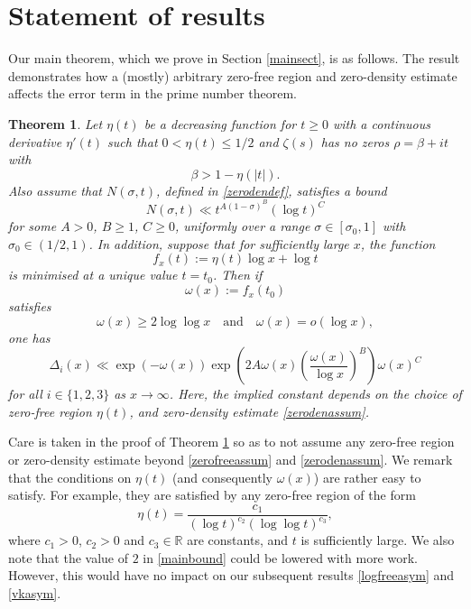 \documentclass[reqno]{amsart}
\newtheorem{theorem}{Theorem}[section]
\numberwithin{equation}{section}
\theoremstyle{remark}
\begin{document}
\section{Statement of results}
Our main theorem, which we prove in Section \ref{mainsect}, is as follows. The result demonstrates how a (mostly) arbitrary zero-free region and zero-density estimate affects the error term in the prime number theorem.
\begin{theorem}\label{mainthm}
    Let $\eta(t)$ be a decreasing function for $t\geq 0$ with a continuous derivative $\eta'(t)$ such that $0<\eta(t)\leq 1/2$ and $\zeta(s)$ has no zeros $\rho=\beta+it$ with
    \begin{equation}\label{zerofreeassum}
        \beta>1-\eta(|t|).
    \end{equation}
    Also assume that $N(\sigma,t)$, defined in \eqref{zerodendef}, satisfies a bound
    \begin{equation}\label{zerodenassum}
        N(\sigma,t)\ll t^{A(1-\sigma)^B}(\log t)^C
    \end{equation}
    for some $A>0$, $B\geq 1$, $C\geq 0$, uniformly over a range $\sigma\in[\sigma_0,1]$ with $\sigma_0\in(1/2,1)$. In addition, suppose that for sufficiently large $x$, the function
    \begin{equation}\label{fdef}
        f_x(t):=\eta(t)\log x+\log t
    \end{equation}
    is minimised at a unique value $t=t_0$. Then if 
    \begin{equation}\label{omegadef}
        \omega(x):=f_x(t_0)
    \end{equation}
    satisfies 
    \begin{equation}\label{omegacons}
        \omega(x)\geq 2\log\log x\quad\text{and}\quad \omega(x)=o(\log x),    
    \end{equation}
    one has
    \begin{equation}\label{mainbound}
        \Delta_{i}(x)\ll\exp(-\omega(x))\exp\left(2A\omega(x)\left(\frac{\omega(x)}{\log x}\right)^B\right)\omega(x)^C
    \end{equation}
    for all $i\in\{1,2,3\}$ as $x\to\infty$. Here, the implied constant depends on the choice of zero-free region $\eta(t)$, and zero-density estimate \eqref{zerodenassum}. 
\end{theorem}
Care is taken in the proof of Theorem \ref{mainthm} so as to not assume any zero-free region or zero-density estimate beyond \eqref{zerofreeassum} and \eqref{zerodenassum}. We remark that the conditions on $\eta(t)$ (and consequently $\omega(x)$) are rather easy to satisfy. For example, they are satisfied by any zero-free region of the form
\begin{equation*}
    \eta(t)=\frac{c_1}{(\log t)^{c_2}(\log\log t)^{c_3}},
\end{equation*}
where $c_1>0$, $c_2>0$ and $c_3\in\mathbb{R}$ are constants, and $t$ is sufficiently large. We also note that the value of $2$ in \eqref{mainbound} could be lowered with more work. However, this would have no impact on our subsequent results \eqref{logfreeasym} and \eqref{vkasym}. 
\end{document}
